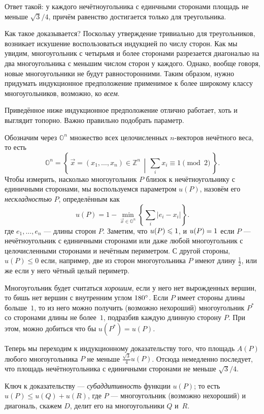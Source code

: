 Ответ такой: у каждого нечётноугольника с единчными сторонами площадь не меньше $\sqrt{3}/4$, причём равенство достигается только для треугольника.

Как такое доказывается?
Поскольку утверждение тривиально для треугольников, возникает искушение воспользоваться индукцией по числу сторон.
Как мы увидим,  многоугольник с четырьмя и более сторонами разрезается диагональю на два многоугольника с меньшим числом сторон у каждого.
Однако, вообще говоря, новые многоугольники не будут равносторонними.
Таким образом, нужно придумать индукционное предположение применимое к более широкому классу многоугольников, возможно, ко \emph{всем}.

Приведённое ниже индукционное предположение отлично работает, хоть и выглядит топорно.
Важно правильно подобрать параметр.

Обозначим через $\mathbb{O}^n$ множество всех целочисленных $n$-векторов нечётного веса, то есть 
\[\mathbb{O}^n=\left\{\,\vec x=(x_1,\dots,x_n)\in \mathbb{Z}^n\,\middle|\, \sum_ix_i\equiv 1\pmod 2\,\right\}.\]
Чтобы измерить, насколько многоугольник $P$ близок к нечётноугольнику с единичными сторонами, мы воспользуемся параметром $u(P)$, назовём его \emph{нескладностью} $P$, определённым как
\[u(P)=1-\min_{\vec x\in \mathbb{O}^n} \left\{\sum_i |e_i-x_i|\right\}.\]
где  $e_1,\dots,e_n$ --- длины сторон $P$.
Заметим, что $u(P)\z\leqslant1$, и $u(P)\z=1$ если $P$ --- нечётноугольник с единичными сторонами или даже любой многоугольник с целочисленными сторонами и нечётным периметром.
С другой стороны, $u(P)\leqslant 0$ если, например, две из сторон многоугольника $P$ имеют длину $\tfrac12$, или же если у него чётный целый периметр.

Многоугольник будет считаться \emph{хорошим}, если у него нет вырожденных вершин,
то бишь нет вершин с внутренним углом $180\degree$.
Если $P$ имеет стороны длины больше~$1$, то из него можно получить (возможно нехороший) многоугольник $P^*$ со сторонами длины не более~$1$, подразбив каждую длинную сторону $P$.
При этом, можно добиться что бы $u(P^*)=u(P)$.

Теперь мы переходим к индукционному доказательству того, что площадь $A(P)$ любого многоугольника $P$ не меньше $\tfrac{\sqrt{3}}{4}u(P)$.
Отсюда немедленно последует, что площадь нечётноугольника с единичными сторонами не меньше  $\sqrt{3}/4$.

Ключ к доказательству --- \emph{субаддитивность} функции $u(P)$;
то есть $u(P)\leqslant u(Q)+u(R)$, где $P$ --- многоугольник (возможно нехороший) и диагональ, скажем $D$, делит его на многоугольники $Q$ и~$R$.

